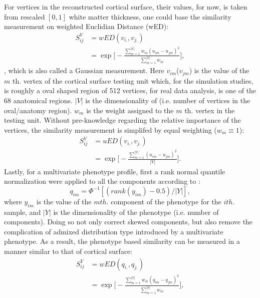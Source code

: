 For vertices in the reconstructed cortical surface, their values, for now, is taken from  rescaled $[0,1]$ white matter thickness, one could base the similarity measurement on weighted Euclidian Distance (wED):
\begin{equation} \label{eq:wSV}
\begin{split}
  S_{ij}^V &= wED(v_{i.},v_{j.}) \\
  &= \exp
  {
    \Big[-\frac{\sum_{m=1}^{|V|}{w_m(u_{im}-u_{jm})^2}} {\sum_{m=1}^{|V|}{w_m}}\Big]
  },
\end{split}
\end{equation}
, which is also called a Gaussian measurement. Here $v_{im}$($v_{jm}$) is the value of the $m$ th. vertex of the cortical surface testing unit which, for the simulation studies, is roughly a oval shaped region of 512 vertices, for real data analysis, is one of the 68 anatomical regions. $|V|$ is the dimensionality of (i.e. number of vertices in the oval/anatomy region). $w_m$ is the weight assigned to the $m$ th. vertex in the testing unit. Without pre-knowledge regarding the relative importance of the vertices, the similarity measurement is simplifed by equal weighting ($w_m \equiv 1$):
\begin{equation*} \label{eq_uSV}
\begin{split}
  S_{ij}^V &= uED(v_{i.},v_{j.}) \\
  &= \exp
  {
    \Big[-\frac{\sum_{m=1}^{|V|}{(u_{im}-u_{jm})^2}} {|V|}\Big]
  }.
\end{split}
\end{equation*}
Lastly, for a multivariate phenotype profile, first a rank normal quantile normalization were applied to all the components according to \cite{HWU}:
\begin{displaymath}
  q_{im}=\Phi^{-1}[(rank(y_{im})-0.5)/|Y|],
\end{displaymath} 
where $y_{im}$ is the value of the $m th.$ component of the phenotype for the $i th.$ sample, and $|Y|$ is the dimensionality of the phenotype (i.e. number of components). Doing so not only correct skewed components, but also remove the complication of admixed distribution type introduced by a multivariate phenotype. As a result, the phenotype based similarity can be measured in a manner similar to that of cortical surface:
\begin{equation} \label{eq_wSY}
\begin{split}
  S_{ij}^Y &= wED(q_{i.},q_{j.}) \\
  &=\exp
  {
    \Big[-\frac{\sum_{m=1}^{|Y|}{w_m(q_{im}-q_{jm})^2}} {\sum_{m=1}^{|Y|}{w_m}}\Big]
  },
\end{split}
\end{equation}
